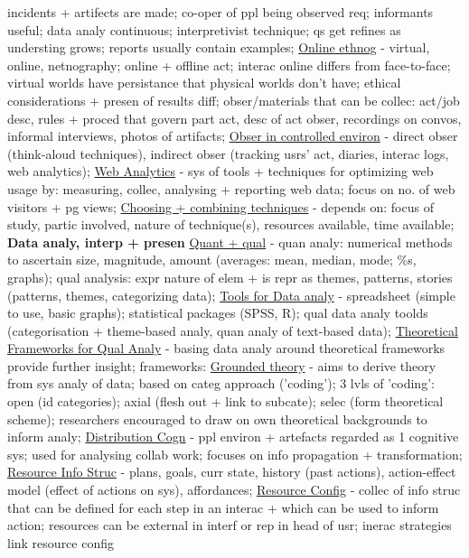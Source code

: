 \documentclass[a4paper]{article}
\begin{document}
\begin{multicols}{3}
        incidents + artifects are made; co-oper of ppl being observed req; informants useful; data analy continuous; interpretivist technique; qs get refines as understing grows; reports
        usually contain examples; \underline{Online ethnog} - virtual, online, netnography; online + offline act; interac online differs from face-to-face; virtual worlds have persistance that physical worlds
        don't have; ethical considerations + presen of results diff; obser/materials that can be collec: act/job desc, rules + proced that govern part act, desc of act obser, recordings on convos,
        informal interviews, photos of artifacts; \underline{Obser in controlled environ} - direct obser (think-aloud techniques), indirect obser (tracking usrs' act, diaries, interac logs, web analytics);
        \underline{Web Analytics} - sys of tools + techniques for optimizing web usage by: measuring, collec, analysing + reporting web data; focus on no. of web visitors + pg views; \underline{Choosing + combining
        techniques} - depends on: focus of study, partic involved, nature of technique(s), resources available, time available; \newline \textbf{Data analy, interp + presen} \underline{Quant + qual} -
        quan analy: numerical methods to ascertain size, magnitude, amount (averages: mean, median, mode; \%s, graphs); qual analysis: expr nature of elem + is repr as themes, patterns, stories (patterns,
        themes, categorizing data); \underline{Tools for Data analy} - spreadsheet (simple to use, basic graphs); statistical packages (SPSS, R); qual data analy toolds (categorisation + theme-based analy, quan analy
        of text-based data); \underline{Theoretical Frameworks for Qual Analy} - basing data analy around theoretical frameworks provide further insight; frameworks: \underline{Grounded theory} -
        aims to derive theory from sys analy of data; based on categ approach ('coding'); 3 lvls of 'coding': open (id categories); axial (flesh out + link to subcate); selec (form theoretical scheme); researchers
        encouraged to draw on own theoretical backgrounds to inform analy; \underline{Distribution Cogn} - ppl environ + artefacts regarded as 1 cognitive sys; used for analysing collab work; focuses on info
        propagation + transformation; \underline{Resource Info Struc} - plans, goals, curr state, history (past actions), action-effect model (effect of actions on sys), affordances; \underline{Resource Config} -
        collec of info struc that can be defined for each step in an interac + which can be used to inform action; resources can be external in interf or rep in head of usr; inerac strategies link resource config

\end{multicols}
\end{document}
